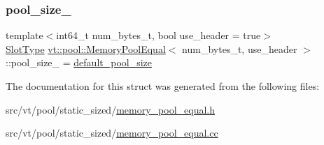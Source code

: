 \subsubsection{\texorpdfstring{pool\+\_\+size\+\_\+}{pool\_size\_}}
{\footnotesize\ttfamily template$<$int64\+\_\+t num\+\_\+bytes\+\_\+t, bool use\+\_\+header = true$>$ \\
\hyperlink{structvt_1_1pool_1_1_memory_pool_equal_af05a2c24c95c666b20e3758745be746b}{Slot\+Type} \hyperlink{structvt_1_1pool_1_1_memory_pool_equal}{vt\+::pool\+::\+Memory\+Pool\+Equal}$<$ num\+\_\+bytes\+\_\+t, use\+\_\+header $>$\+::pool\+\_\+size\+\_\+ = \hyperlink{structvt_1_1pool_1_1_memory_pool_equal_a8daca02e94e9ab587670808525561c71}{default\+\_\+pool\+\_\+size}\hspace{0.3cm}{\ttfamily [private]}}



The documentation for this struct was generated from the following files\+:\begin{DoxyCompactItemize}
\item 
src/vt/pool/static\+\_\+sized/\hyperlink{memory__pool__equal_8h}{memory\+\_\+pool\+\_\+equal.\+h}\item 
src/vt/pool/static\+\_\+sized/\hyperlink{memory__pool__equal_8cc}{memory\+\_\+pool\+\_\+equal.\+cc}\end{DoxyCompactItemize}
